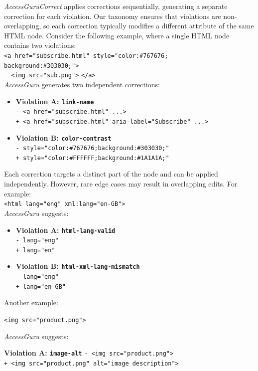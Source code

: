 \documentclass[sigconf, nonacm]{acmart}
\newcommand{\method}{\emph{AccessGuru}}
\begin{document}
\method\emph{Correct}{} applies corrections sequentially, generating a separate correction for each violation. Our taxonomy ensures that violations are non-overlapping, so each correction typically modifies a different attribute of the same HTML node.  Consider the following example, where a single HTML node contains two violations: \\
\noindent\texttt{<a href="subscribe.html" style="color:\#767676; \\ background:\#303030;">} \\
\texttt{\ \ <img src="sub.png">} \texttt{</a>} \\
\noindent\method{} generates two independent corrections:
\begin{itemize}
\item \textbf{Violation A: \texttt{link-name}}  \\
\texttt{- <a href="subscribe.html" ...>} \\
\texttt{+ <a href="subscribe.html" aria-label="Subscribe" ...>}
\item \textbf{Violation B: \texttt{color-contrast}} \\ 
\texttt{- style="color:\#767676;background:\#303030;"} \\
\texttt{+ style="color:\#FFFFFF;background:\#1A1A1A;"}
\end{itemize}
Each correction targets a distinct part of the node and can be applied independently. However, rare edge cases may result in overlapping edits. For example:\\
\texttt{<html lang="eng" xml:lang="en-GB">} \\
\noindent\method{} suggests:
\begin{itemize}
    \item \textbf{Violation A: \texttt{html-lang-valid}}  \\
\texttt{- lang="eng"} \\
\texttt{+ lang="en"}
\item \textbf{Violation B: \texttt{html-xml-lang-mismatch}}\\
\texttt{- lang="eng"} \\
\texttt{+ lang="en-GB"}
\end{itemize}
\iffalse
Another example:


\texttt{<img src="product.png">}

\noindent\method{} suggests:

\textbf{Violation A: \texttt{image-alt}}  
\texttt{- <img src="product.png">} \\
\texttt{+ <img src="product.png" alt="image description">}
\end{document}
